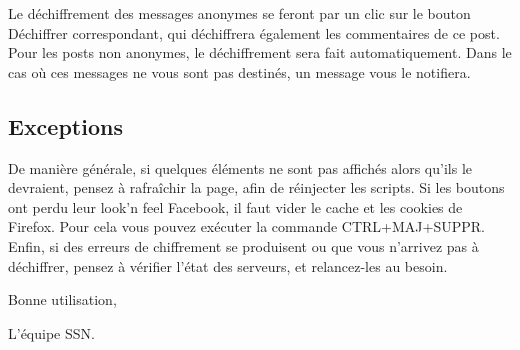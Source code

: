 \documentclass[a4paper,10pt]{article}
\begin{document}
Le déchiffrement des messages anonymes se feront par un clic sur le bouton 
\og Déchiffrer \fg{} correspondant, qui déchiffrera également les commentaires de ce post.
Pour les posts non anonymes, le déchiffrement sera fait automatiquement. Dans le cas où
ces messages ne vous sont pas destinés, un message vous le notifiera.

\subsection{Exceptions}

De manière générale, si quelques éléments ne sont pas affichés alors qu'ils le devraient,
pensez à rafraîchir la page, afin de réinjecter les scripts. Si les boutons ont perdu
leur \og look'n feel \fg{} Facebook, il faut vider le cache et les cookies de Firefox. Pour
cela vous pouvez exécuter la commande CTRL+MAJ+SUPPR. Enfin, si des erreurs de chiffrement
se produisent ou que vous n'arrivez pas à déchiffrer, pensez à vérifier l'état des serveurs,
 et relancez-les au besoin.


Bonne utilisation,

L'équipe SSN.
\end{document}
